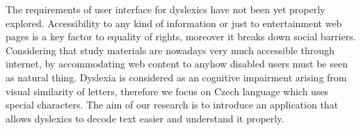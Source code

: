 The requirements of user interface for dyslexics have not been yet properly explored. Accessibility to any kind of information or just to entertainment web pages is a key factor to equality of rights, moreover it breaks down social barriers. Considering that study materials are nowadays very much accessible through internet, by accommodating web content to anyhow disabled users must be seen as natural thing. Dyslexia is considered as an cognitive impairment arising from visual similarity of letters, therefore we focus on Czech language which uses special characters. The aim of our research is to introduce an application that allows dyslexics to decode text easier and understand it properly.
